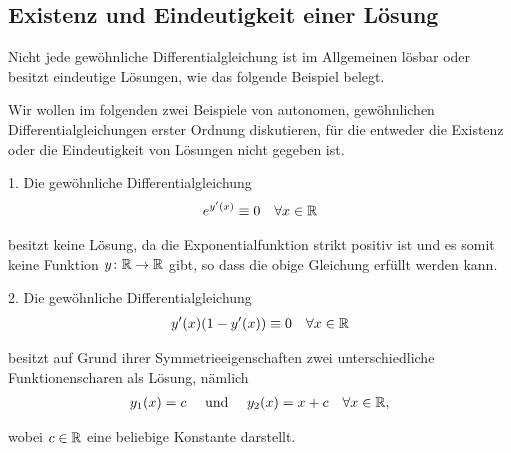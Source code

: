 \subsection{Existenz und Eindeutigkeit einer Lösung}
\label{\detokenize{ode/repetition:existenz-und-eindeutigkeit-einer-losung}}
\par
Nicht jede gewöhnliche Differentialgleichung ist im Allgemeinen lösbar oder besitzt eindeutige Lösungen, wie das folgende Beispiel belegt.
\label{ode/repetition:example-7}
\begin{example}{}{}



\par
Wir wollen im folgenden zwei Beispiele von autonomen, gewöhnlichen Differentialgleichungen erster Ordnung diskutieren, für die entweder die Existenz oder die Eindeutigkeit von Lösungen nicht gegeben ist.

\par
1. Die gewöhnliche Differentialgleichung
\begin{align*}
e^{y'(x)} \equiv 0 \quad \forall x \in \mathbb{R}
\end{align*}
\par
besitzt keine Lösung, da die Exponentialfunktion strikt positiv ist und es somit keine Funktion \(y \colon \mathbb{R} \rightarrow \mathbb{R}\) gibt, so dass die obige Gleichung erfüllt werden kann.

\par
2. Die gewöhnliche Differentialgleichung
\begin{align*}
y'(x)(1-y'(x)) \equiv 0 \quad \forall x \in \mathbb{R}
\end{align*}
\par
besitzt auf Grund ihrer Symmetrieeigenschaften zwei unterschiedliche Funktionenscharen als Lösung, nämlich
\begin{align*}
y_1(x) = c \quad \text{ und } \quad y_2(x) = x + c \quad \forall x \in \mathbb{R},
\end{align*}
\par
wobei \(c \in \mathbb{R}\) eine beliebige Konstante darstellt.
\end{example}

